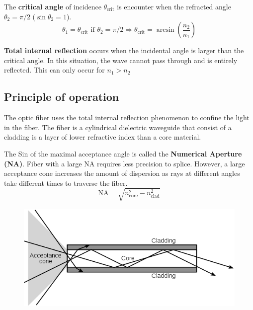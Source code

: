 \documentclass[twocolumn]{article}
\numberwithin{equation}{section}
\begin{document}
The \textbf{critical angle} of incidence $\theta_\text{crit}$ is encounter when the refracted angle $\theta_2=\pi/2$ ($\sin\theta_2=1$).
$$\theta_1 = \theta_\text{crit} \text{ if } \theta_2=\pi/2 \Rightarrow \theta_\text{crit}=\arcsin\left(\frac{n_2}{n_1}\right)$$

\textbf{Total internal reflection} occurs when the incidental angle is larger than the critical angle. In this situation, the wave cannot pass through and is entirely reflected. This can only occur for $n_1>n_2$

	\subsection{Principle of operation}
The optic fiber uses the total internal reflection phenomenon to confine the light in the fiber. The fiber is a cylindrical dielectric waveguide that consist of a cladding is a layer of lower refractive index than a core material. 

The Sin of the maximal acceptance angle is called the \textbf{Numerical Aperture (NA)}. Fiber with a large NA requires less precision to splice. However, a large acceptance cone increases the amount of dispersion as rays at different angles take different times to traverse the fiber.
$$\mathrm{NA}=\sqrt{n_\mathrm{core}^2-n_\mathrm{clad}^2}$$

\begin{figure}[H]
	\centering
	\includegraphics[width=.5\textwidth]{550px-Optical-fibre.png}
\end{figure}
\end{document}

